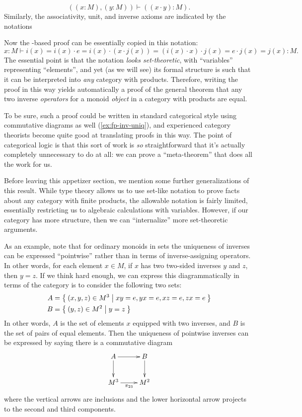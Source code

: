 \documentclass{book}
\let\types\vdash
\newcommand{\F}[1]{\mathfrak{F}_{#1}}
\begin{document}
\[ ((x:M),(y:M)) \types ((x\cdot y) :M). \]
Similarly, the associativity, unit, and inverse axioms are indicated by the notations
Now the \bSet-based proof can be essentially copied in this notation:
\[ x:M \types i(x) = i(x) \cdot e = i(x) \cdot (x \cdot j(x)) = (i(x)\cdot x)\cdot j(x) = e\cdot j(x) = j(x) : M.\]
The essential point is that the notation \emph{looks set-theoretic}, with ``variables'' representing ``elements'', and yet (as we will see) its formal structure is such that it can be interpreted into \emph{any} category with products.
Therefore, writing the proof in this way yields automatically a proof of the general theorem that any two inverse \emph{operators} for a monoid \emph{object} in a category with products are equal.

To be sure, such a proof could be written in standard categorical style using commutative diagrams as well (\cref{ex:fp-inv-uniq}), and experienced category theorists become quite good at translating proofs in this way.
The point of categorical logic is that this sort of work is \emph{so} straightforward that it's actually completely unnecessary to do at all: we can prove a ``meta-theorem'' that does all the work for us.

Before leaving this appetizer section, we mention some further generalizations of this result.
While type theory allows us to use set-like notation to prove facts about any category with finite products, the allowable notation is fairly limited, essentially restricting us to algebraic calculations with variables.
However, if our category has more structure, then we can ``internalize'' more set-theoretic arguments.

As an example, note that for ordinary monoids in sets the uniqueness of inverses can be expressed ``pointwise'' rather than in terms of inverse-assigning operators.
In other words, for each element $x\in M$, if $x$ has two two-sided inverses $y$ and $z$, then $y=z$.
If we think hard enough, we can express this diagrammatically in terms of the category \bSet is to consider the following two sets:
\begin{align*}
  A &= \Set{(x,y,z)\in M^3 | xy=e, yx=e, xz=e, zx=e}\\
  B &= \Set{(y,z)\in M^2 | y=z}
\end{align*}
In other words, $A$ is the set of elements $x$ equipped with two inverses, and $B$ is the set of pairs of equal elements.
Then the uniqueness of pointwise inverses can be expressed by saying there is a commutative diagram
\[ \xymatrix{ A \ar[d] \ar[r] & B \ar[d] \\ M^3 \ar[r]_{\pi_{23}} & M^2 } \]
where the vertical arrows are inclusions and the lower horizontal arrow projects to the second and third components.
\end{document}
